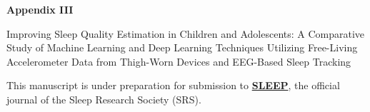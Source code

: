 \documentclass[
  10pt,
]{scrbook}
\let\originaltextbf\textbf
\renewcommand{\textbf}[1]{\textcolor{color1}{\textsf{\originaltextbf{#1}}}}
\begin{document}


\begin{center}

\textbf{\textsf{\Huge Appendix III}}



\vspace{2cm}

\textsf{\Huge Improving Sleep Quality Estimation in Children and Adolescents: A Comparative Study of Machine Learning and Deep Learning Techniques Utilizing Free-Living Accelerometer Data from Thigh-Worn Devices and EEG-Based Sleep Tracking}

\vspace{5cm}

This manuscript is under preparation for submission to \href{https://academic.oup.com/sleep}{\textbf{SLEEP}}, the official journal of the Sleep Research Society (SRS).

\vspace{1cm}

\end{center}




\backmatter
\end{document}
